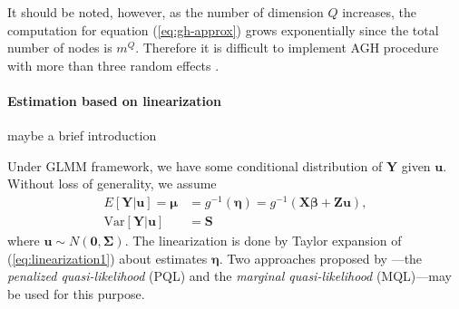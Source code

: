 It should be noted, however, as the number of dimension $Q$ increases, the computation for
equation (\ref{eq:gh-approx}) grows exponentially since the total number of nodes is $m^Q$. 
Therefore it is difficult to implement AGH procedure with more than three random effects
\citep{bolker2009generalized}.


\paragraph{Estimation based on linearization}\label{para:linearization}


{\large maybe a brief introduction}

Under GLMM framework, we have some conditional distribution of $\bm Y$ given $\bm u$. Without loss
of generality, we assume
\begin{equation}\label{eq:linearization1}
	\begin{aligned}
		E[\bm Y|\bm u] = \bm \mu &= g^{-1}(\bm \eta) = g^{-1}(\bm{X\beta} + \bm {Zu}), \\
		\text{Var}[\bm Y|\bm u]  & = \bm S
	\end{aligned}
\end{equation}
where $\bm u \sim N(\bm 0, \bm \Sigma)$.  The linearization is done by Taylor expansion of
(\ref{eq:linearization1}) about estimates $\bm \eta$. Two approaches proposed by \citet{breslow1993approximate}---the
\textit{penalized quasi-likelihood } (PQL) and the \textit{marginal quasi-likelihood} (MQL)---may be used
for this purpose. 

